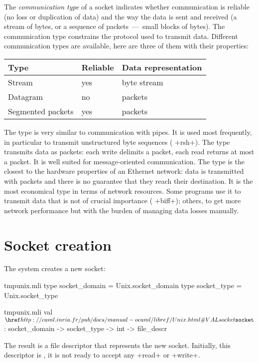 The \emph{communication type} of a socket indicates whether
communication is reliable (no loss or duplication of data) and the way
the data is sent and received (a stream of bytes, or a sequence of
packets~---~small blocks of bytes). The communication type
constrains the protocol used to transmit data. Different communication
types are available, here are three of them with their properties:
%
\begin{center}
\begin{tabular}{lll}
Type & Reliable & Data representation \\
\hline
Stream & yes & byte stream \\
Datagram & no & packets \\
Segmented packets & yes & packets \\
\hline
\end{tabular}
\end{center}
% 
The  type is very similar to communication with pipes.
It is used most frequently, in particular to transmit unstructured
byte sequences (\eg{} \ml+rsh+).  The  type
transmits data as packets: each write delimits a packet, each read
returns at most a packet. It is well suited for message-oriented
communication. The  type is the closest to the
hardware properties of an Ethernet network: data is transmitted with
packets and there is no guarantee that they reach their
destination. It is the most economical type in terms of network
resources. Some programs use it to transmit data that is not of
crucial importance (\eg{} \ml+biff+); others, to get more network
performance but with the burden of managing data losses manually. 


%
\section{Socket creation}

The  system creates a new socket:
%
\begin{codefile}{tmpunix.mli}
type socket_domain = Unix.socket_domain
type socket_type = Unix.socket_type
\end{codefile}
%
\begin{listingcodefile}{tmpunix.mli}
val $\libvalue{Unix}{socket}$ : socket_domain -> socket_type -> int -> file_descr
\end{listingcodefile}
% 
The result is a file descriptor that represents the new
socket. Initially, this descriptor is , 
it is not ready to accept any \ml+read+ or \ml+write+. 

